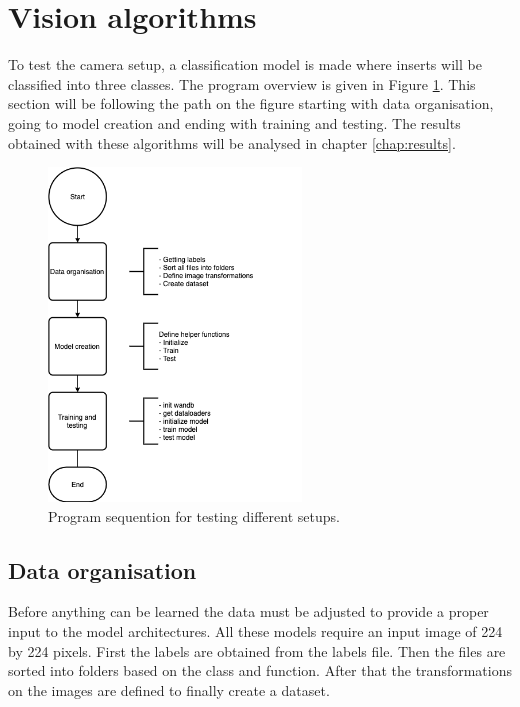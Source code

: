 \section{Vision algorithms}
\label{sec:impl:visionalgorithms}
	To test the camera setup, a classification model is made where inserts will be classified into three classes. The program overview is given in Figure \ref{fig:impl:va:prog:overview}. This section will be following the path on the figure starting with data organisation, going to model creation and ending with training and testing. The results obtained with these algorithms will be analysed in chapter \ref{chap:results}. 
	
	\begin{figure}[hbtp]
		\centering
		\includegraphics[width=0.6\textwidth]{fig/Vision/GoogleColab/Test_Camera_Setup/Program_sequention.png}
		\caption{Program sequention for testing different setups.}
		\label{fig:impl:va:prog:overview}
	\end{figure}
	
	\subsection{Data organisation}
	\label{sec:impl:visionalgorithms:dataorganisation}
		Before anything can be learned the data must be adjusted to provide a proper input to the model architectures. All these models require an input image of 224 by 224 pixels. First the labels are obtained from the labels file. Then the files are sorted into folders based on the class and function. After that the transformations on the images are defined to finally create a dataset. 
		
